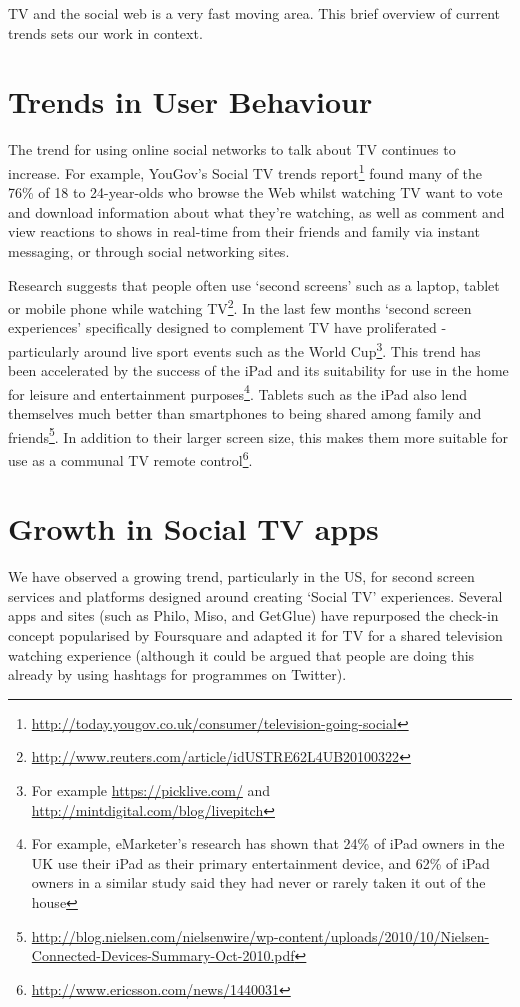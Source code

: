\documentclass{notube}
\begin{document}
TV and the social web is a very fast moving area. This brief overview of current trends sets our work in context.

\section{Trends in User Behaviour}

The trend for using online social networks to talk about TV continues to increase. For example, YouGov's Social TV trends report\footnote{\url{http://today.yougov.co.uk/consumer/television-going-social}}  found many of the 76\% of 18 to 24-year-olds who browse the Web whilst watching TV want to vote and download information about what they're watching, as well as comment and view reactions to shows in real-time from their friends and family via instant messaging, or through social networking sites.

Research suggests that people often use `second screens' such as a laptop, tablet or mobile phone while watching TV\footnote{\url{http://www.reuters.com/article/idUSTRE62L4UB20100322}}. In the last few months `second screen experiences' specifically designed to complement TV have proliferated  - particularly around live sport events such as the World Cup\footnote{For example \url{https://picklive.com/} and \url{http://mintdigital.com/blog/livepitch}}. This trend has been accelerated by the success of the iPad and its suitability for use in the home for leisure and entertainment purposes\footnote{For example, eMarketer's research has shown that 24\% of iPad owners in the UK use their iPad as their primary entertainment device, and 62\% of iPad owners in a similar study said they had never or rarely taken it out of the house}. Tablets such as the iPad also lend themselves much better than smartphones to being shared among family and friends\footnote{\url{http://blog.nielsen.com/nielsenwire/wp-content/uploads/2010/10/Nielsen-Connected-Devices-Summary-Oct-2010.pdf}}. In addition to their larger screen size, this makes them more suitable for use as a communal TV remote control\footnote{\url{http://www.ericsson.com/news/1440031}}.

\section{Growth in Social TV apps}

We have observed a growing trend, particularly in the US, for second screen services and platforms designed around creating `Social TV' experiences. Several apps and sites (such as Philo, Miso, and GetGlue) have repurposed the check-in concept popularised by Foursquare and adapted it for TV for a shared television watching experience (although it could be argued that people are doing this already by using hashtags for programmes on Twitter).
\end{document}
